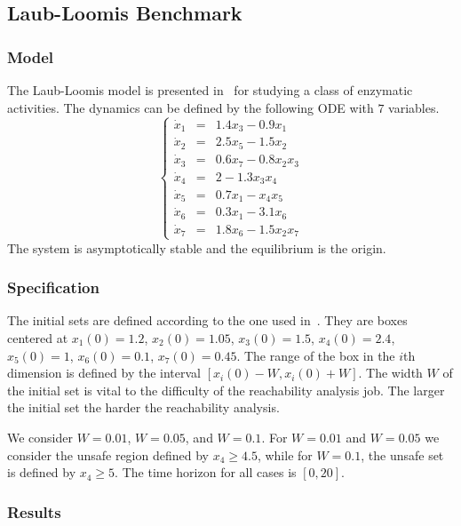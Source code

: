 \documentclass[EPiC]{easychair}
\begin{document}
\subsection{Laub-Loomis Benchmark}

\subsubsection{Model}

The Laub-Loomis model is presented in~\cite{Laub+Loomis/1998/oscillator} for studying a class of enzymatic activities. The dynamics can be defined by the following ODE with $7$ variables.
\[
\left\{
\begin{array}{lcl}
 \dot{x}_1 & = & 1.4 x_3 - 0.9 x_1 \\
 \dot{x}_2 & = & 2.5 x_5 - 1.5 x_2 \\
 \dot{x}_3 & = & 0.6 x_7 - 0.8 x_2 x_3 \\
 \dot{x}_4 & = & 2 - 1.3 x_3 x_4 \\
 \dot{x}_5 & = & 0.7 x_1 - x_4 x_5 \\
 \dot{x}_6 & = & 0.3 x_1 - 3.1 x_6 \\
 \dot{x}_7 & = & 1.8 x_6 - 1.5 x_2 x_7
\end{array}
\right.
\]
The system is asymptotically stable and the equilibrium is the origin.


\subsubsection{Specification}

The initial sets are defined according to the one used in~\cite{Testylier+/2013/NLTOOLBOX}. They are boxes centered at $x_1(0) = 1.2$, $x_2(0) = 1.05$, $x_3(0) =
1.5$, $x_4(0) = 2.4$, $x_5(0) = 1$, $x_6(0) = 0.1$, $x_7(0) = 0.45$. The range of the box in the $i$th dimension is defined by the interval $[x_i(0)-W, x_i(0)+W]$. The width $W$ of the initial set is vital to the difficulty of the reachability analysis job. The larger the initial set the harder the reachability analysis. 

We consider $W = 0.01$, $W = 0.05$, and $W = 0.1$.
For $W=0.01$ and $W=0.05$ we consider the unsafe region defined by $x_4 \geq 4.5$, while for $W=0.1$, the unsafe set is defined by $x_4 \geq 5$. The time horizon for all cases is $[0,20]$.


\subsubsection{Results}
\end{document}

